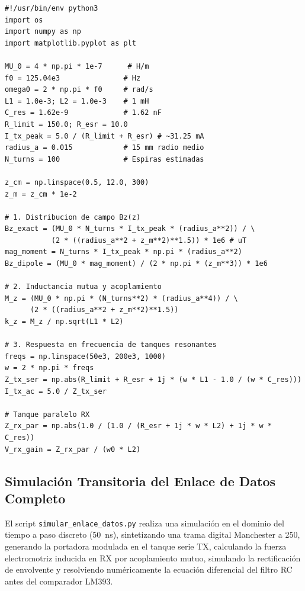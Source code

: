 \begin{lstlisting}[style=custompy, caption={Cálculo de campo magnético y acoplamiento (\texttt{informe\_ieee/datos/generar\_graficos.py})}]
#!/usr/bin/env python3
import os
import numpy as np
import matplotlib.pyplot as plt

MU_0 = 4 * np.pi * 1e-7      # H/m
f0 = 125.04e3               # Hz
omega0 = 2 * np.pi * f0     # rad/s
L1 = 1.0e-3; L2 = 1.0e-3    # 1 mH
C_res = 1.62e-9             # 1.62 nF
R_limit = 150.0; R_esr = 10.0
I_tx_peak = 5.0 / (R_limit + R_esr) # ~31.25 mA
radius_a = 0.015            # 15 mm radio medio
N_turns = 100               # Espiras estimadas

z_cm = np.linspace(0.5, 12.0, 300)
z_m = z_cm * 1e-2

# 1. Distribucion de campo Bz(z)
Bz_exact = (MU_0 * N_turns * I_tx_peak * (radius_a**2)) / \
           (2 * ((radius_a**2 + z_m**2)**1.5)) * 1e6 # uT
mag_moment = N_turns * I_tx_peak * np.pi * (radius_a**2)
Bz_dipole = (MU_0 * mag_moment) / (2 * np.pi * (z_m**3)) * 1e6

# 2. Inductancia mutua y acoplamiento
M_z = (MU_0 * np.pi * (N_turns**2) * (radius_a**4)) / \
      (2 * ((radius_a**2 + z_m**2)**1.5))
k_z = M_z / np.sqrt(L1 * L2)

# 3. Respuesta en frecuencia de tanques resonantes
freqs = np.linspace(50e3, 200e3, 1000)
w = 2 * np.pi * freqs
Z_tx_ser = np.abs(R_limit + R_esr + 1j * (w * L1 - 1.0 / (w * C_res)))
I_tx_ac = 5.0 / Z_tx_ser

# Tanque paralelo RX
Z_rx_par = np.abs(1.0 / (1.0 / (R_esr + 1j * w * L2) + 1j * w * C_res))
V_rx_gain = Z_rx_par / (w0 * L2)
\end{lstlisting}

\subsection{Simulación Transitoria del Enlace de Datos Completo}

El script \texttt{simular\_enlace\_datos.py} realiza una simulación en el dominio del tiempo a paso discreto (\SI{50}{\nano\second}), sintetizando una trama digital Manchester a \SI{250}{}, generando la portadora modulada en el tanque serie TX, calculando la fuerza electromotriz inducida en RX por acoplamiento mutuo, simulando la rectificación de envolvente y resolviendo numéricamente la ecuación diferencial del filtro RC antes del comparador LM393.

